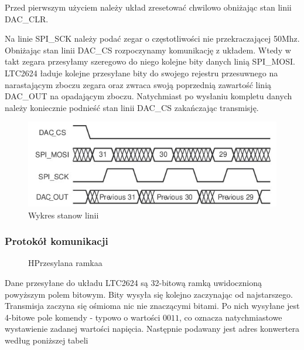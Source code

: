 \documentclass[a4paper,12pt]{article}
\begin{document}
Przed pierwszym użyciem należy układ zresetować chwilowo obniżając stan linii DAC\_CLR.

Na linie SPI\_SCK należy podać zegar o częstotliwości nie przekraczającej 50Mhz. Obniżając stan linii DAC\_CS rozpoczynamy komunikację z układem. Wtedy w takt zegara przesyłamy szeregowo do niego kolejne bity danych linią SPI\_MOSI. LTC2624 ładuje kolejne przesyłane bity do swojego rejestru przesuwnego na narastającym zboczu zegara oraz zwraca swoją poprzednią zawartość linią DAC\_OUT na opadającym zboczu. Natychmiast po wysłaniu kompletu danych należy koniecznie podnieść stan linii DAC\_CS zakańczając transmisję.

\begin{figure}[htb]
   \centering
   \includegraphics[width=15cm]{grafika/dac-waveform.jpg}
   \caption{Wykres stanow linii}
\end{figure}


\newpage
\subsubsection{Protokół komunikacji}

\begin{figure}[htb]
  \centering
	\begin{register}{H}{Przesylana ramka}{a}
	\label{dacprotocol}%
	\end{register}
\end{figure}

Dane przesyłane do układu LTC2624 są 32-bitową ramką uwidocznioną powyższym polem bitowym. Bity wysyła się kolejno zaczynając od najstarszego. Transmisja zaczyna się ośmioma nic nie znaczącymi bitami. Po nich wysyłane jest 4-bitowe pole komendy - typowo o wartości $0011$, co oznacza natychmiastowe wystawienie zadanej wartości napięcia. Następnie podawany jest adres konwertera według poniższej tabeli
\end{document}
